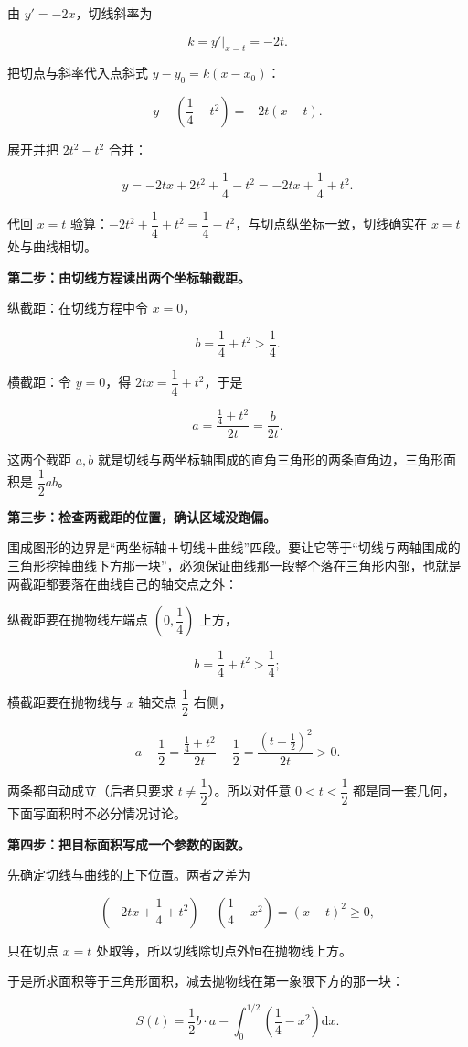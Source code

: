 \documentclass[UTF8,11pt,fontset=windows]{ctexart}
\begin{document}
由 $y'=-2x$，切线斜率为

$$
k=y'\big|_{x=t}=-2t.
$$

把切点与斜率代入点斜式 $y-y_0=k(x-x_0)$：

$$
y-\left(\frac14-t^2\right)=-2t(x-t).
$$

展开并把 $2t^2-t^2$ 合并：

$$
y=-2tx+2t^2+\frac14-t^2=-2tx+\frac14+t^2.
$$

代回 $x=t$ 验算：$-2t^2+\dfrac14+t^2=\dfrac14-t^2$，与切点纵坐标一致，切线确实在 $x=t$ 处与曲线相切。

\textbf{第二步：由切线方程读出两个坐标轴截距。}

纵截距：在切线方程中令 $x=0$，

$$
b=\frac14+t^2>\frac14.
$$

横截距：令 $y=0$，得 $2tx=\dfrac14+t^2$，于是

$$
a=\frac{\frac14+t^2}{2t}=\frac{b}{2t}.
$$

这两个截距 $a,b$ 就是切线与两坐标轴围成的直角三角形的两条直角边，三角形面积是 $\dfrac12ab$。

\textbf{第三步：检查两截距的位置，确认区域没跑偏。}

围成图形的边界是“两坐标轴＋切线＋曲线”四段。要让它等于“切线与两轴围成的三角形挖掉曲线下方那一块”，必须保证曲线那一段整个落在三角形内部，也就是两截距都要落在曲线自己的轴交点之外：

纵截距要在抛物线左端点 $\left(0,\dfrac14\right)$ 上方，

$$
b=\frac14+t^2>\frac14;
$$

横截距要在抛物线与 $x$ 轴交点 $\dfrac12$ 右侧，

$$
a-\frac12=\frac{\frac14+t^2}{2t}-\frac12=\frac{\left(t-\frac12\right)^2}{2t}>0.
$$

两条都自动成立（后者只要求 $t\ne\dfrac12$）。所以对任意 $0<t<\dfrac12$ 都是同一套几何，下面写面积时不必分情况讨论。

\textbf{第四步：把目标面积写成一个参数的函数。}

先确定切线与曲线的上下位置。两者之差为

$$
\left(-2tx+\frac14+t^2\right)-\left(\frac14-x^2\right)=(x-t)^2\ge0,
$$

只在切点 $x=t$ 处取等，所以切线除切点外恒在抛物线上方。

于是所求面积等于三角形面积，减去抛物线在第一象限下方的那一块：

$$
S(t)=\frac12 b\cdot a-\int_0^{1/2}\left(\frac14-x^2\right)\mathrm dx.
$$
\end{document}
